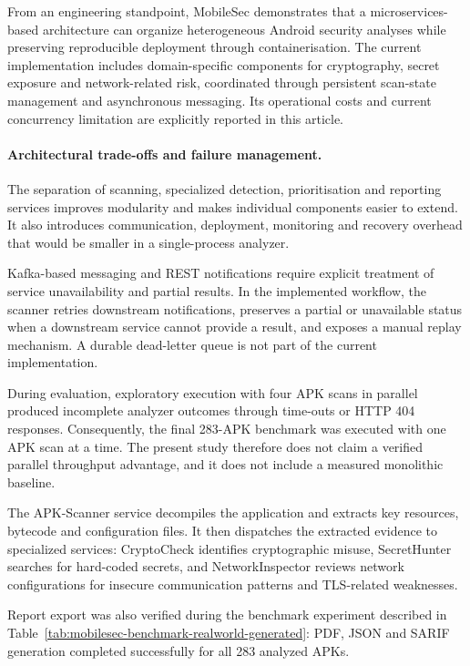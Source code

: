 From an engineering standpoint, MobileSec demonstrates that a
microservices-based architecture can organize heterogeneous Android security
analyses while preserving reproducible deployment through containerisation.
The current implementation includes domain-specific components for
cryptography, secret exposure and network-related risk, coordinated through
persistent scan-state management and asynchronous messaging. Its operational
costs and current concurrency limitation are explicitly reported in this
article.

\paragraph{Architectural trade-offs and failure management.}
The separation of scanning, specialized detection, prioritisation and
reporting services improves modularity and makes individual components easier
to extend. It also introduces communication, deployment, monitoring and
recovery overhead that would be smaller in a single-process analyzer.

Kafka-based messaging and REST notifications require explicit treatment of
service unavailability and partial results. In the implemented workflow, the
scanner retries downstream notifications, preserves a partial or unavailable
status when a downstream service cannot provide a result, and exposes a manual
replay mechanism. A durable dead-letter queue is not part of the current
implementation.

During evaluation, exploratory execution with four APK scans in parallel
produced incomplete analyzer outcomes through time-outs or HTTP 404 responses.
Consequently, the final 283-APK benchmark was executed with one APK scan at a
time. The present study therefore does not claim a verified parallel
throughput advantage, and it does not include a measured monolithic baseline.

The APK-Scanner service decompiles the application and extracts key resources,
bytecode and configuration files. It then dispatches the extracted evidence to
specialized services: CryptoCheck identifies cryptographic misuse,
SecretHunter searches for hard-coded secrets, and NetworkInspector reviews
network configurations for insecure communication patterns and TLS-related
weaknesses.

Report export was also verified during the benchmark experiment described in
Table~\ref{tab:mobilesec-benchmark-realworld-generated}: PDF, JSON and SARIF
generation completed successfully for all 283 analyzed APKs.

